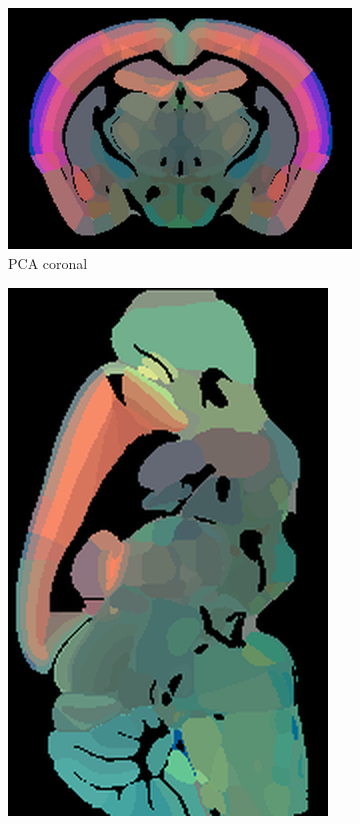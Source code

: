 \documentclass[]{article}
\begin{document}
\begin{figure}
	\centering
	\begin{subfigure}{.25\textwidth}
		\centering
		\includegraphics[width=.9\linewidth]{../results/pca_ano_coronal_50_res_slice_1.png}
		\caption{PCA coronal}
		\label{fig:PCA_cor}
	\end{subfigure}
	\begin{subfigure}{.176\textwidth}
		\centering
		\includegraphics[width=.9\linewidth, angle=270]{../results/pca_ano_sagittal_50_res_slice_1.png}

\end{subfigure}
\end{figure}
\end{document}
